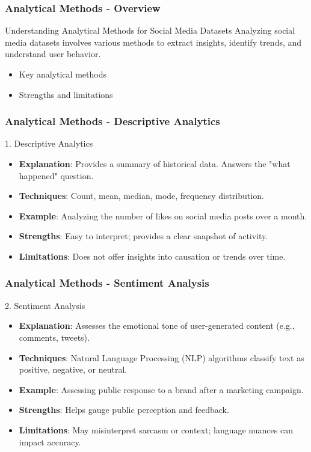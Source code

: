 \documentclass{beamer}
\begin{document}
\begin{frame}[fragile]
    \frametitle{Analytical Methods - Overview}
    \begin{block}{Understanding Analytical Methods for Social Media Datasets}
        Analyzing social media datasets involves various methods to extract insights, identify trends, and understand user behavior.
    \end{block}

    \begin{itemize}
        \item Key analytical methods
        \item Strengths and limitations
    \end{itemize}
\end{frame}

\begin{frame}[fragile]
    \frametitle{Analytical Methods - Descriptive Analytics}
    \begin{block}{1. Descriptive Analytics}
        \begin{itemize}
            \item \textbf{Explanation}: Provides a summary of historical data. Answers the "what happened" question.
            \item \textbf{Techniques}: Count, mean, median, mode, frequency distribution.
            \item \textbf{Example}: Analyzing the number of likes on social media posts over a month.
            \item \textbf{Strengths}: Easy to interpret; provides a clear snapshot of activity.
            \item \textbf{Limitations}: Does not offer insights into causation or trends over time.
        \end{itemize}
    \end{block}
\end{frame}

\begin{frame}[fragile]
    \frametitle{Analytical Methods - Sentiment Analysis}
    \begin{block}{2. Sentiment Analysis}
        \begin{itemize}
            \item \textbf{Explanation}: Assesses the emotional tone of user-generated content (e.g., comments, tweets).
            \item \textbf{Techniques}: Natural Language Processing (NLP) algorithms classify text as positive, negative, or neutral.
            \item \textbf{Example}: Assessing public response to a brand after a marketing campaign.
            \item \textbf{Strengths}: Helps gauge public perception and feedback.
            \item \textbf{Limitations}: May misinterpret sarcasm or context; language nuances can impact accuracy.
        \end{itemize}
    \end{block}
\end{frame}
\end{document}
